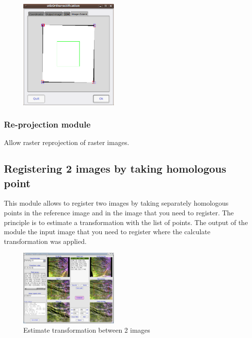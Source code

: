 \begin{figure}
   \center
   \includegraphics[width=0.44\textwidth]{../Art/MonteverdiImages/monteverdi_ortho_extent.png}
   \label{fig:ortho}
\end{figure}

\subsubsection{Re-projection module}
Allow raster reprojection of raster images.
\subsection{Registering 2 images by taking homologous point}
This module allows to register two images by taking separately homologous points in the reference image and in the image 
that you need to register. The principle is to estimate a transformation with the list of points.
The output of the module the input image that you need to register where the calculate transformation was applied. 

\begin{figure}[!htbp]
   \center
   \includegraphics[width=0.44\textwidth]{../Art/MonteverdiImages/monteverdi_homologous_point.png}
   \caption{Estimate transformation between 2 images}
   \label{fig:homologous}
\end{figure}


